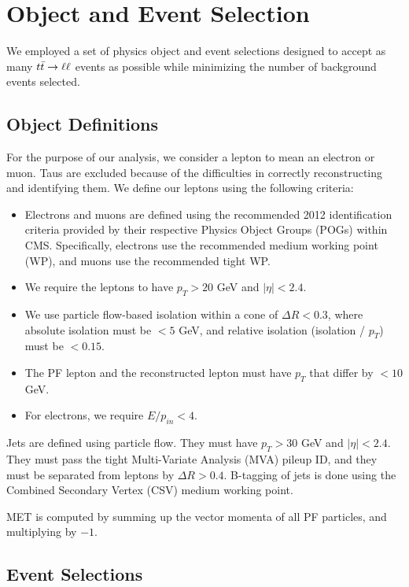 \section{Object and Event Selection}
\label{sec:afb:selections}

We employed a set of physics object and event selections designed to
accept as many $t\bar{t} \rightarrow \ell\ell$ events as possible while minimizing the
number of background events selected.

\subsection{Object Definitions}
\label{ssec:afb:objdefs}

For the purpose of our analysis, we consider a lepton to mean an
electron or muon. Taus are excluded because of the difficulties in
correctly reconstructing and identifying them. We define our leptons
using the following criteria:

\begin{itemize}
\item Electrons and muons are defined using the recommended
  2012 identification criteria provided by their respective Physics Object
  Groups (POGs) within CMS. Specifically, electrons use the
  recommended medium working point (WP), and muons use the recommended
  tight WP.
\item We require the leptons to have $p_T > 20$ GeV and $|\eta| < 2.4$.
\item We use particle flow-based isolation within a cone of $\Delta R
  < 0.3$, where absolute isolation must be $< 5$ GeV, and relative
  isolation (isolation / $p_T$) must be $< 0.15$. %
\item The PF lepton and the reconstructed lepton must have $p_T$ that
  differ by $< 10$ GeV.
\item For electrons, we require $E / p_{in} < 4$. %
\end{itemize}

Jets are defined using particle flow. They must have $p_T > 30$ GeV
and $|\eta| < 2.4$. They must pass the tight Multi-Variate Analysis
(MVA) pileup ID, and they must be separated from leptons by $\Delta R
> 0.4$. B-tagging of jets is done using the Combined Secondary Vertex
(CSV) medium working point.

MET is computed by summing up the vector momenta of all PF particles,
and multiplying by $-1$.

\subsection{Event Selections}
\label{ssec:afb:eventsel}

